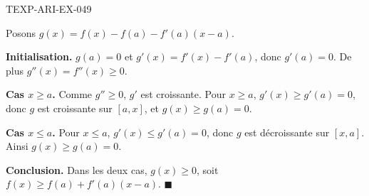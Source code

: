 \begin{corrige}{TEXP-ARI-EX-049}

Posons $g(x) = f(x) - f(a) - f'(a)(x - a)$.


\textbf{Initialisation.} $g(a) = 0$ et $g'(x) = f'(x) - f'(a)$, donc $g'(a) = 0$. De plus $g''(x) = f''(x) \geq 0$.

\textbf{Cas $x \geq a$.} Comme $g'' \geq 0$, $g'$ est croissante. Pour $x \geq a$, $g'(x) \geq g'(a) = 0$, donc $g$ est croissante sur $[a, x]$, et $g(x) \geq g(a) = 0$.

\textbf{Cas $x \leq a$.} Pour $x \leq a$, $g'(x) \leq g'(a) = 0$, donc $g$ est décroissante sur $[x, a]$. Ainsi $g(x) \geq g(a) = 0$.

\textbf{Conclusion.} Dans les deux cas, $g(x) \geq 0$, soit $f(x) \geq f(a) + f'(a)(x - a)$. $\blacksquare$

\end{corrige}
